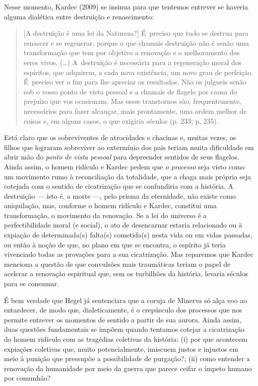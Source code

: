 Nesse momento, Kardec (2009) se insinua para que tentemos entrever se
haveria alguma dialética entre destruição e renascimento:

\begin{quote}
{[}A destruição é uma lei da Natureza?{]} É~preciso que tudo se destrua
para renascer e se regenerar, porque o que chamais destruição não é
senão uma transformação que tem por objetivo a renovação e o
melhoramento dos seres vivos. (\ldots{}) A~destruição é necessária para
a regeneração moral dos espíritos, que adquirem, a cada nova existência,
um novo grau de perfeição. É~preciso ver o fim para lhe apreciar os
resultados. Não os julgueis senão sob o vosso ponto de vista pessoal e a
chamais de flagelo por causa do prejuízo que vos ocasionam. Mas esses
transtornos são, frequentemente, necessários para fazer alcançar, mais
prontamente, uma ordem melhor de coisas e, em alguns casos, o que
exigiria séculos (p. 233; p. 235).
\end{quote}

Está claro que os sobreviventes de atrocidades e chacinas e, muitas
vezes, os filhos que lograram sobreviver ao extermínio dos pais teriam
muita dificuldade em abrir mão do \emph{ponto de vista pessoal} para
depreender sentidos de seus flagelos. Ainda assim, o homem ridículo e
Kardec pedem que \emph{o processo} seja visto como um movimento rumo à
reconciliação da totalidade, que a chaga mais própria seja cotejada com
o sentido de cicatrização que se confundiria com a história. A
destruição --- isto é, a morte ---, pelo prisma da eternidade, não existe
como aniquilação, mas, conforme o homem ridículo e Kardec, constitui uma
transformação, o movimento da renovação. Se a lei do universo é a
perfectibilidade moral (e social), o ato de desencarnar estaria
relacionado ou à expiação de determinada(s) falta(s) cometida(s) nesta
vida ou em vidas passadas, ou então à noção de que, no plano em que se
encontra, o espírito já teria vivenciado todas as provações para a sua
cicatrização. Mas reparemos que Kardec menciona a questão de que
convulsões mais traumáticas teriam o papel de acelerar a renovação
espiritual que, sem os turbilhões da história, levaria séculos para se
consumar.

É bem verdade que Hegel já sentenciara que a coruja de Minerva só alça
voo ao entardecer, de modo que, dialeticamente, é o crepúsculo dos
processos que nos permite entrever os momentos de sentido a partir de
sua aurora. Ainda assim, duas questões fundamentais se impõem quando
tentamos cotejar a cicatrização do homem ridículo com as tragédias
coletivas da história: (i) por que acontecem expiações coletivas que,
muito potencialmente, imiscuem justos e injustos em meio à punição que
pressupõe a possibilidade de purgação?; (ii) como entender a renovação
da humanidade por meio da guerra que parece ceifar o ímpeto humano por
comunhão?

